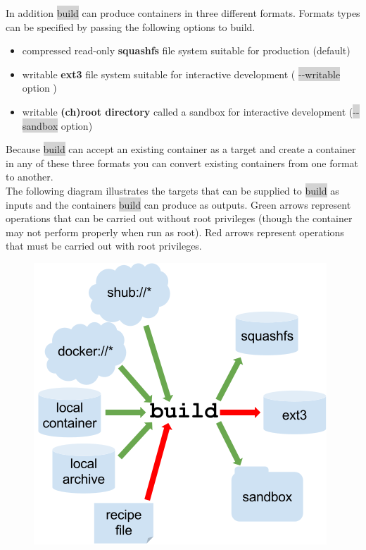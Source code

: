 \documentclass[a4paper]{article}
\begin{document}
In addition \colorbox{lightgray}{build} can produce containers in three different formats. Formats types can be specified by passing the following options to build.
\\
\begin{itemize}
\item compressed read-only \textbf{squashfs} file system suitable for production (default)
\item writable \textbf{ext3} file system suitable for interactive development ( \colorbox{lightgray}{-{}-writable} option )
\item writable \textbf{(ch)root directory} called a sandbox for interactive development (\colorbox{lightgray}{-{}-sandbox} option)
\end{itemize}

Because \colorbox{lightgray}{build} can accept an existing container as a target and create a container in any of these three formats you can convert existing containers from one format to another.\\

The following diagram illustrates the targets that can be supplied to \colorbox{lightgray}{build} as inputs and the containers \colorbox{lightgray}{build} can produce as outputs. Green arrows represent operations that can be carried out without root privileges (though the container may not perform properly when run as root). Red arrows represent operations that must be carried out with root privileges.


\begin{figure}[h]
\centering
\hspace*{-0.62in}
  {\includegraphics[scale=0.50]{assets/img/build_input_output.png}}
\end{figure}
\end{document}
